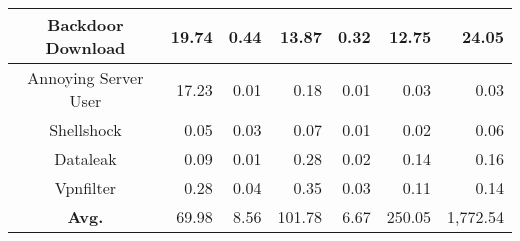 \begin{table*}[]
{\begin{tabular}{c|r|r|r|r|r|r}
Backdoor Download                  & 19.74                                                    & 0.44                                                         & 13.87                                & 0.32                                 & 12.75                                & 24.05                               \\ \hline
Annoying Server User               & 17.23                                                    & 0.01                                                         & 0.18                                 & 0.01                                 & 0.03                                 & 0.03                                \\ \hline
Shellshock                         & 0.05                                                     & 0.03                                                         & 0.07                                 & 0.01                                 & 0.02                                 & 0.06                                \\ \hline
Dataleak                           & 0.09                                                     & 0.01                                                         & 0.28                                 & 0.02                                 & 0.14                                 & 0.16                                \\ \hline
Vpnfilter                          & 0.28                                                     & 0.04                                                         & 0.35                                 & 0.03                                 & 0.11                                 & 0.14                                \\ \hline
\textbf{Avg.}                                & 69.98                                                    & 8.56                                                         & 101.78                               & 6.67                                 & 250.05                               & 1,772.54                            \\ \hline
\end{tabular}
}
\label{tab:rq4performance}
\end{table*}
